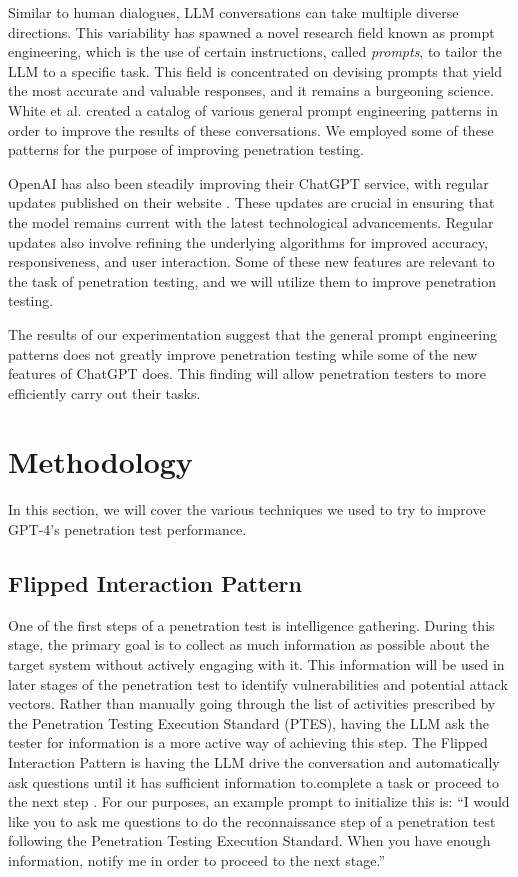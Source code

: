 \documentclass[conference]{IEEEtran}
\begin{document}
Similar to human dialogues, LLM conversations can take multiple diverse directions. This variability has spawned a novel research field known as prompt engineering, which is the use of certain instructions, called \textit{prompts}, to tailor the LLM to a specific task. This field is concentrated on devising prompts that yield the most accurate and valuable responses, and it remains a burgeoning science. White et al. created a catalog of various general prompt engineering patterns in order to improve the results of these conversations\cite{white2023prompt}. We employed some of these patterns for the purpose of improving penetration testing.

OpenAI has also been steadily improving their ChatGPT service, with regular updates published on their website \cite{releasenotes}. These updates are crucial in ensuring that the model remains current with the latest technological advancements. Regular updates also involve refining the underlying algorithms for improved accuracy, responsiveness, and user interaction. Some of these new features are relevant to the task of penetration testing, and we will utilize them to improve penetration testing.

The results of our experimentation suggest that the general prompt engineering patterns does not greatly improve penetration testing while some of the new features of ChatGPT does. This finding will allow penetration testers to more efficiently carry out their tasks.

\section{Methodology} \label{sec:approach}
In this section, we will cover the various techniques we used to try to improve GPT-4's penetration test performance.

\subsection{Flipped Interaction Pattern} \label{ssec:flipped}
One of the first steps of a penetration test is intelligence gathering\cite{ptes}. During this stage, the primary goal is to collect as much information as possible about the target system without actively engaging with it. This information will be used in later stages of the penetration test to identify vulnerabilities and potential attack vectors. Rather than manually going through the list of activities prescribed by the Penetration Testing Execution Standard (PTES), having the LLM ask the tester for information is a more active way of achieving this step. The Flipped Interaction Pattern is having the LLM drive the conversation and automatically ask questions until it has sufficient information to.complete a task or proceed to the next step \cite{white2023prompt}. For our purposes, an example prompt to initialize this is: “I would like you to ask me questions to do the reconnaissance step of a penetration test following the Penetration Testing Execution Standard. When you have enough information, notify me in order to proceed to the next stage.”
\end{document}
